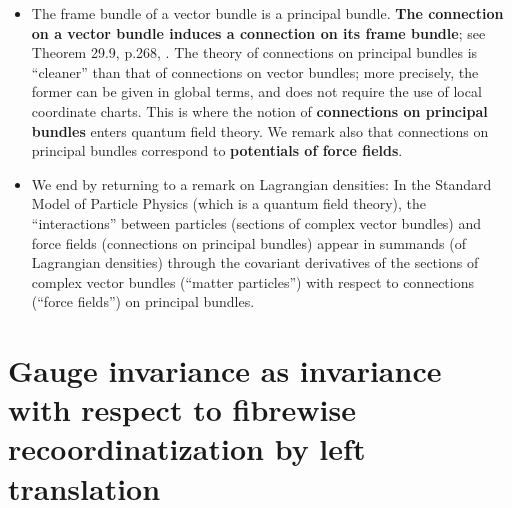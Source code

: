 \begin{itemize}
	This is where the notion of \textbf{covariant derivatives} of sections of complex vector bundles
	-- hence the notion of \textbf{connections} on vector bundles -- enters quantum field theory:
	On a general vector bundle \,$E$\, (with no additional structure) over spacetime,
	there is no canonical notion of spacetime derivatives for smooth sections of \,$E$.\,
	A \textbf{\color{red}connection} on \,$E$\, is the additional structure required
	to define a notion of spacetime derivatives for smooth sections of \,$E$.\,
\item
	The frame bundle of a vector bundle is a principal bundle.
	\textbf{The connection on a vector bundle induces a connection on its frame bundle};
	see Theorem 29.9, p.268, \cite{Tu2017}.
	The theory of connections on principal bundles is ``cleaner'' than that of connections on vector bundles;
	more precisely, the former can be given in global terms, and does not require the use of local coordinate charts.
	This is where the notion of \textbf{\color{red}connections on principal bundles}
	enters quantum field theory.
	We remark also that connections on principal bundles correspond to
	\textbf{\color{red}potentials of force fields}.
\item
	We end by returning to a remark on Lagrangian densities:
	In  the Standard Model of Particle Physics (which is a quantum field theory),
	the ``interactions'' between particles (sections of complex vector bundles)
	and force fields (connections on principal bundles)
	appear in summands (of Lagrangian densities)
	through the covariant derivatives of the sections of complex vector bundles
	(``matter particles'') with respect to connections (``force fields'') on principal bundles.
\end{itemize}


\vskip 0.5cm
\section{Gauge invariance as invariance with respect to fibrewise recoordinatization by left translation}


